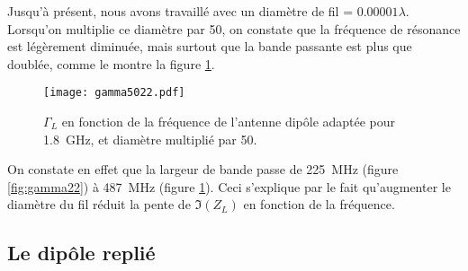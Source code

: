 Jusqu'à présent, nous avons travaillé avec un diamètre de fil = $0.00001 \lambda$. Lorsqu'on multiplie ce diamètre par 50, on constate que la fréquence de résonance est légèrement diminuée, mais surtout que la bande passante est plus que doublée, comme le montre la figure \ref{fig:gamma5022}.
\begin{figure}[htbp]
  \centering
  \texttt{[image: gamma5022.pdf]}
  \caption{$\Gamma_L$  en fonction de la fréquence de l'antenne dipôle adaptée pour \SI{1.8}{\giga\hertz}, et diamètre multiplié par 50.\label{fig:gamma5022}}
\end{figure}
On constate en effet que la largeur de bande passe de \SI{225}{\mega\hertz} (figure \ref{fig:gamma22}) à \SI{487}{\mega\hertz} (figure \ref{fig:gamma5022}). Ceci s'explique par le fait qu'augmenter le diamètre du fil réduit la pente de $\Im(Z_L)$ en fonction de la fréquence.

\subsection{Le dipôle replié}





